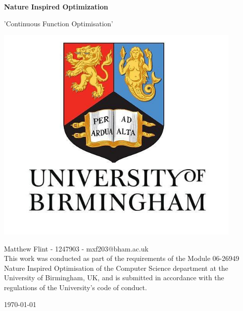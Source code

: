 \documentclass{article}
\begin{document}
    \begin{center}
        \LARGE
        \textbf{Nature Inspired Optimization}
        
        \vspace{0.2cm}
        \large
        'Continuous Function Optimisation'
        
        \vspace{1cm}
        \includegraphics[width=0.9\textwidth]{university}

        \vfill
        
        \large
        \textbf{}
        
        \vspace{0.3cm}
        \normalsize
        Matthew Flint - 1247903 - mxf203@bham.ac.uk\\
        
        \vspace{0.5cm}
		This work was conducted as part of the requirements of the Module 06-26949 Nature Inspired Optimisation of the Computer Science department at the University of Birmingham, UK, and is submitted in accordance with the regulations of the University's code of conduct.
		
		\vspace{0.2cm}
		\today
		
    \end{center}
    \newpage
\end{document}

